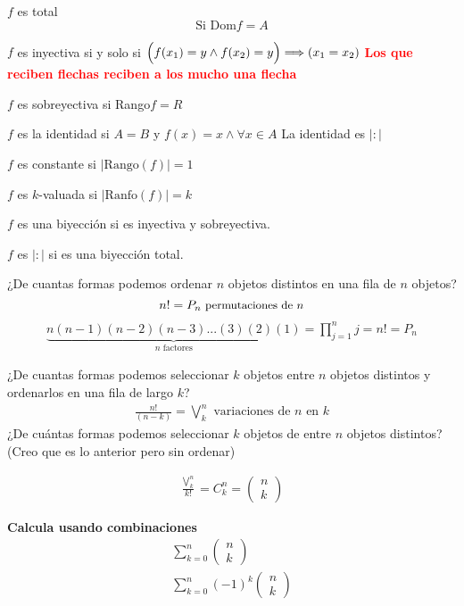 \documentclass[../main.tex]{subfiles}
\begin{document}
$f$ es total
\[\text{Si Dom}f=A\]

$f$ es inyectiva si y solo si $\Big{(}f(x_1)=y\wedge f(x_2)=y\Big{)}\Longrightarrow(x_1=x_2)$
\textcolor{red}{ \textbf{Los que reciben flechas reciben a los mucho una flecha}}

$f$ es sobreyectiva si Rango$f=R$

$f$ es la identidad si $A=B$ y $f(x)=x \wedge \forall x\in A$
La identidad es $|:|$

$f$ es constante si $|\text{Rango}(f)|=1$

$f$ es $k$-valuada si $|\text{Ranfo}(f)|=k$

$f$ es una biyección si es inyectiva y sobreyectiva.

$f$ es $|:|$ si es una biyección total.

¿De cuantas formas podemos ordenar $n$ objetos distintos en una fila de $n$ objetos?
{\Huge
	\[n!=P_n\text{\small\ permutaciones de $n$}\]
}
\begin{align*}
	\underbrace{n(n-1)(n-2)(n-3)...(3)(2)(1)}_{\text{$n$ factores}}
	= \prod^n_{j=1}j=n!=P_n
\end{align*}

¿De cuantas formas podemos seleccionar $k$ objetos entre $n$ objetos distintos y
ordenarlos en una fila de largo $k$?
\begin{align*}
	\frac{n!}{(n-k)} = \bigvee^n_k \text{\ variaciones de $n$ en $k$}
\end{align*}
¿De cuántas formas podemos seleccionar $k$ objetos de entre $n$ objetos distintos?
(Creo que es lo anterior pero sin ordenar)

\begin{align*}
	\frac{\bigvee^n_k}{k!}= C^n_k =
	\begin{pmatrix}
		n\\
		k
	\end{pmatrix}
\end{align*}

\textbf{Calcula usando combinaciones }
\begin{align*}
	\sum^n_{k=0} \begin{pmatrix}
		n\\
		k
	\end{pmatrix}\\
	\sum^n_{k=0}(-1)^k
	\begin{pmatrix}
		n\\
		k
	\end{pmatrix}
\end{align*}
\end{document}
